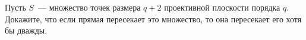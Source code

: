 Пусть $S$~--- множество точек размера $q + 2$ проективной плоскости порядка $q$. Докажите, что если прямая пересекает это
множество, то она пересекает его хотя бы дважды.